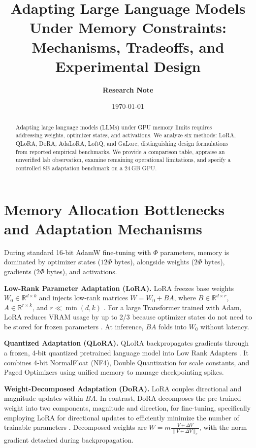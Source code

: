 \documentclass[11pt,a4paper]{article}
\title{\textbf{Adapting Large Language Models Under Memory Constraints:\\Mechanisms, Tradeoffs, and Experimental Design}}
\author{\textbf{Research Note}}
\date{\today}
\begin{document}
\maketitle

\begin{abstract}
Adapting large language models (LLMs) under GPU memory limits requires addressing weights, optimizer states, and activations. We analyze six methods: LoRA, QLoRA, DoRA, AdaLoRA, LoftQ, and GaLore, distinguishing design formulations from reported empirical benchmarks. We provide a comparison table, appraise an unverified lab observation, examine remaining operational limitations, and specify a controlled 8B adaptation benchmark on a 24\,GB GPU.
\end{abstract}

\section{Memory Allocation Bottlenecks and Adaptation Mechanisms}

During standard 16-bit AdamW fine-tuning with $\Phi$ parameters, memory is dominated by optimizer states ($12\Phi$ bytes), alongside weights ($2\Phi$ bytes), gradients ($2\Phi$ bytes), and activations.

\textbf{Low-Rank Parameter Adaptation (LoRA).} LoRA freezes base weights $W_0 \in \mathbb{R}^{d \times k}$ and injects low-rank matrices $W = W_0 + B A$, where $B \in \mathbb{R}^{d \times r}$, $A \in \mathbb{R}^{r \times k}$, and $r \ll \min(d, k)$ \cite{hu2021lora}. For a large Transformer trained with Adam, LoRA reduces VRAM usage by up to 2/3 because optimizer states do not need to be stored for frozen parameters \cite{hu2021lora}. At inference, $B A$ folds into $W_0$ without latency.

\textbf{Quantized Adaptation (QLoRA).} QLoRA backpropagates gradients through a frozen, 4-bit quantized pretrained language model into Low Rank Adapters \cite{dettmers2023qlora}. It combines 4-bit NormalFloat (NF4), Double Quantization for scale constants, and Paged Optimizers using unified memory to manage checkpointing spikes.

\textbf{Weight-Decomposed Adaptation (DoRA).} LoRA couples directional and magnitude updates within $BA$. In contrast, DoRA decomposes the pre-trained weight into two components, magnitude and direction, for fine-tuning, specifically employing LoRA for directional updates to efficiently minimize the number of trainable parameters \cite{liu2024dora}. Decomposed weights are $W = m \frac{V + \Delta V}{\|V + \Delta V\|_c}$, with the norm gradient detached during backpropagation.
\end{document}

